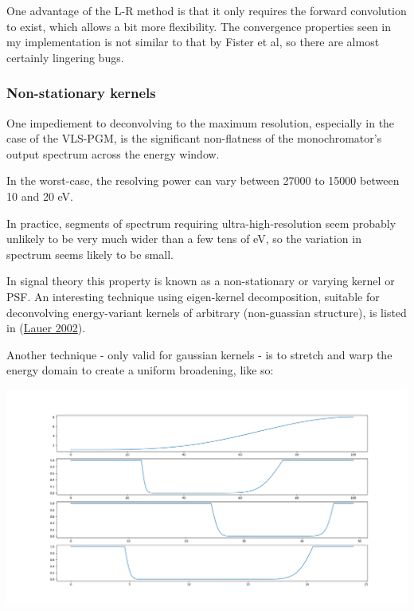 \documentclass[
]{article}
\begin{document}
One advantage of the L-R method is that it only requires the forward
convolution to exist, which allows a bit more flexibility. The
convergence properties seen in my implementation is not similar to that
by Fister et al, so there are almost certainly lingering bugs.

\hypertarget{non-stationary-kernels}{%
\subsubsection{Non-stationary kernels}\label{non-stationary-kernels}}

One impediement to deconvolving to the maximum resolution, especially in
the case of the VLS-PGM, is the significant non-flatness of the
monochromator's output spectrum across the energy window.

In the worst-case, the resolving power can vary between 27000 to 15000
between 10 and 20 eV.

In practice, segments of spectrum requiring ultra-high-resolution seem
probably unlikely to be very much wider than a few tens of eV, so the
variation in spectrum seems likely to be small.

In signal theory this property is known as a non-stationary or varying
kernel or PSF. An interesting technique using eigen-kernel
decomposition, suitable for deconvolving energy-variant kernels of
arbitrary (non-guassian structure), is listed in
(\protect\hyperlink{ref-Deconvolution2002}{Lauer 2002}).

Another technique - only valid for gaussian kernels - is to stretch and
warp the energy domain to create a uniform broadening, like so:

\includegraphics{stretch.png}
\end{document}
